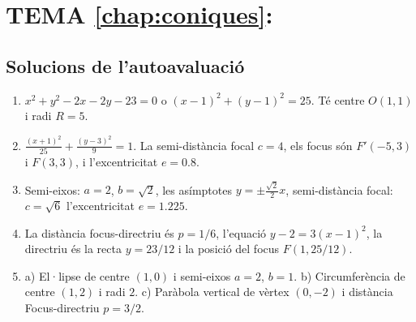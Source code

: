 \section*{TEMA \ref{chap:coniques}: }

\subsection*{Solucions de l'autoavaluació}

\begin{enumerate}
\item $x^2+y^2-2x-2y-23=0$ o $(x-1)^2+(y-1)^2=25$. Té centre $O(1,1)$ i radi $R=5$.

\item $\frac{(x+1)^2}{25}+\frac{(y-3)^2}{9}=1$. La semi-distància focal $c=4$, els focus són $F'(-5,3)$ i $F(3,3)$, i l'excentricitat $e=0.8$.

\item Semi-eixos: $a=2$, $b=\sqrt{2}$, les asímptotes $y=\pm\frac{\sqrt{2}}{2}x$, semi-distància focal: $c=\sqrt{6}$ l'excentricitat $e=1.225$.

\item La distància focus-directriu és $p=1/6$, l'equació $y-2=3 (x-1)^2$, la directriu és la recta $y=23/12$ i la posició del focus $F(1, 25/12)$.

\item a) El·lipse de centre $(1,0)$ i semi-eixos $a=2$, $b=1$.  b) Circumferència de centre $(1,2)$ i radi $2$. c) Paràbola vertical de vèrtex $(0,-2)$ i distància Focus-directriu $p=3/2$.
\end{enumerate}




